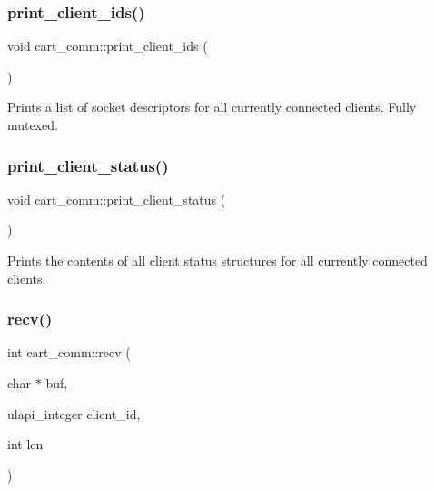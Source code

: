 \subsubsection{\texorpdfstring{print\+\_\+client\+\_\+ids()}{print\_client\_ids()}}
{\footnotesize\ttfamily void cart\+\_\+comm\+::print\+\_\+client\+\_\+ids (\begin{DoxyParamCaption}{ }\end{DoxyParamCaption})}

Prints a list of socket descriptors for all currently connected clients. Fully mutexed. \mbox{\label{classcart__comm_a46b117a719b4844c97b570229c82cbc8}} 
\subsubsection{\texorpdfstring{print\+\_\+client\+\_\+status()}{print\_client\_status()}}
{\footnotesize\ttfamily void cart\+\_\+comm\+::print\+\_\+client\+\_\+status (\begin{DoxyParamCaption}{ }\end{DoxyParamCaption})}

Prints the contents of all client status structures for all currently connected clients. \mbox{\label{classcart__comm_ab7f3cc745c6935abadf38a87a00740c8}} 
\subsubsection{\texorpdfstring{recv()}{recv()}}
{\footnotesize\ttfamily int cart\+\_\+comm\+::recv (\begin{DoxyParamCaption}\item[{char $\ast$}]{buf,  }\item[{ulapi\+\_\+integer}]{client\+\_\+id,  }\item[{int}]{len }\end{DoxyParamCaption})}

